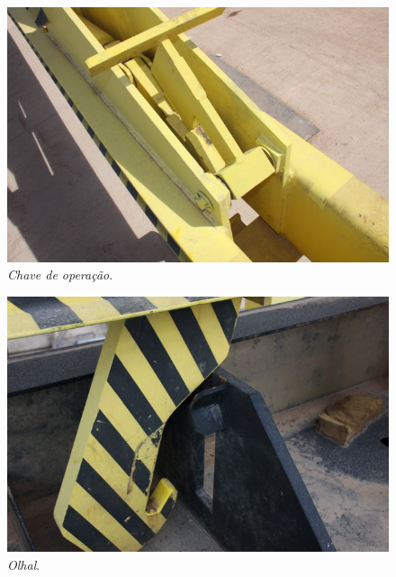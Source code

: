\begin{figure}[H]
    \centering
    \includegraphics[width=1\columnwidth]{figs/nomenclatura/5.jpg}
    \caption{\emph{Chave de operação}.}
    \label{nomenclatura_5}
\end{figure}

\begin{figure}[H]
    \centering
    \includegraphics[width=1\columnwidth]{figs/nomenclatura/nomenclatura_6.jpg}
    \caption{\emph{Olhal}.}
    \label{nomenclatura_6}
\end{figure}
